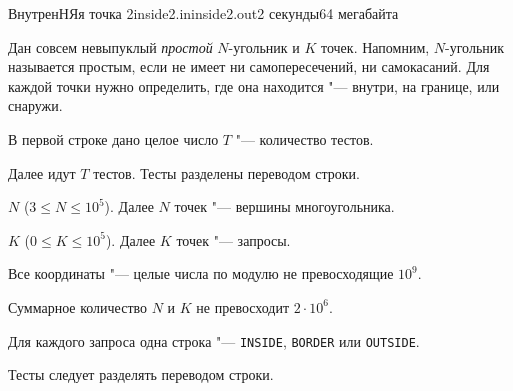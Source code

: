 
\begin{problem}{ВнутренНЯя точка 2}{inside2.in}{inside2.out}{2 секунды}{64 мегабайта}

Дан совсем невыпуклый \emph{простой} $N$-угольник и $K$ точек.
Напомним, $N$-угольник называется простым, если не имеет ни самопересечений, ни самокасаний.
Для каждой точки нужно определить, где она находится "--- внутри, на границе, или снаружи.

\InputFile

В первой строке дано целое число $T$ "--- количество тестов. 

Далее идут $T$ тестов.
Тесты разделены переводом строки. 

$N$ ($3 \le N \le 10^5$). Далее $N$ точек "--- вершины многоугольника.

$K$ ($0 \le K \le 10^5$). Далее $K$ точек "--- запросы.

Все координаты "--- целые числа по модулю не превосходящие $10^9$.


Суммарное количество $N$ и $K$ не превосходит $2 \cdot 10^6$.
\OutputFile

Для каждого запроса одна строка "--- \texttt{INSIDE}, \texttt{BORDER} или \texttt{OUTSIDE}.

Тесты следует разделять переводом строки. 

\Examples

\begin{example}
%
\end{example}

\end{problem}
